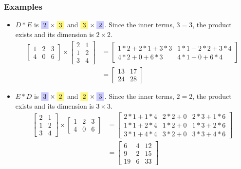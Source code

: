 \documentclass[14pt]{extarticle}
\newcommand{\yhighlight}[1]{%
	\colorbox{yellow!50}{$\displaystyle#1$}}
\newcommand{\bhighlight}[1]{%
	\colorbox{blue!20}{$\displaystyle#1$}}
\begin{document}
\subsubsection*{Examples}
\begin{itemize}
	\item $D*E$ is $\bhighlight{2} \times \yhighlight{3}$ and $\yhighlight{3}\times \bhighlight{2}$. Since the inner terms, $3 = 3$, the product exists and its dimension is $2\times 2$.
\begin{align*}
	\begin{bmatrix}
		1 & 2 & 3 \\
		4 & 0 & 6
	\end{bmatrix} \times
	\begin{bmatrix}
		2 & 1 \\
		1 & 2 \\
		3 & 4
	\end{bmatrix} &= 
	\begin{bmatrix}
		1*2+2*1+3*3 & 1*1+2*2+3*4 \\
		4*2+0+6*3 & 4*1+0+6*4
	\end{bmatrix} \\
	& = \begin{bmatrix}
		13 & 17 \\
		24 & 28
	\end{bmatrix}
\end{align*}
\item $E*D$ is $\bhighlight{3} \times \yhighlight{2}$ and $\yhighlight{2}\times \bhighlight{3}$. Since the inner terms, $2 = 2$, the product exists and its dimension is $3\times 3$.
\begin{align*}
	\begin{bmatrix}
		2 & 1 \\
		1 & 2 \\
		3 & 4
	\end{bmatrix} \times
	\begin{bmatrix}
		1 & 2 & 3 \\
		4 & 0 & 6
	\end{bmatrix} 
	 &= 
	\begin{bmatrix}
		2*1+1*4 & 2*2+0 & 2*3+1*6 \\
		1*1+2*4 & 1*2+0 & 1*3+2*6 \\
		3*1+4*4 & 3*2+0 & 3*3+4*6
	\end{bmatrix} \\
	& = \begin{bmatrix}
		6 & 4 & 12 \\
		9 & 2 & 15 \\
		19 & 6 & 33
	\end{bmatrix}
	\end{align*}
\end{itemize}
\end{document}
